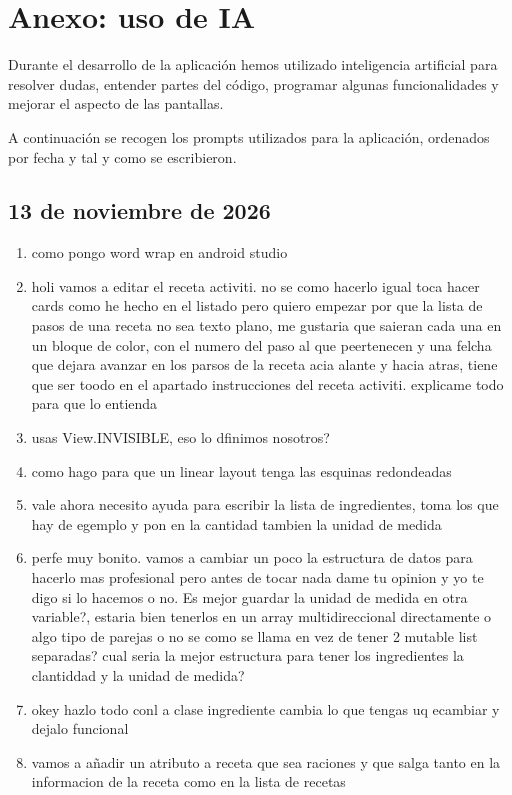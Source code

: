 \chapter{Anexo: uso de IA}
Durante el desarrollo de la aplicación hemos utilizado inteligencia artificial para resolver dudas, entender partes del código, programar algunas funcionalidades y mejorar el aspecto de las pantallas.

A continuación se recogen los prompts utilizados para la aplicación, ordenados por fecha y tal y como se escribieron.

\section{13 de noviembre de 2026}
\begin{enumerate}
  \item como pongo word wrap en android studio
  \item holi vamos a editar el receta activiti. no se como hacerlo igual toca hacer cards como he hecho en el listado pero quiero empezar por que la lista de pasos de una receta no sea texto plano, me gustaria que saieran cada una en un bloque de color, con el numero del paso al que peertenecen y una felcha que dejara avanzar en los parsos de la receta acia alante y hacia atras, tiene que ser toodo en el apartado instrucciones del receta activiti. explicame todo para que lo entienda
  \item usas View.INVISIBLE, eso lo dfinimos nosotros?
  \item como hago para que un linear layout tenga las esquinas redondeadas
  \item vale ahora necesito ayuda para escribir la lista de ingredientes, toma los que hay de egemplo y pon en la cantidad tambien la unidad de medida
  \item perfe muy bonito. vamos a cambiar un poco la estructura de datos para hacerlo mas profesional pero antes de tocar nada dame tu opinion y yo te digo si lo hacemos o no. Es mejor guardar la unidad de medida en otra variable?, estaria bien tenerlos en un array multidireccional directamente o algo tipo de parejas o no se como se llama en vez de tener 2 mutable list separadas? cual seria la mejor estructura para tener los ingredientes la clantiddad y la unidad de medida?
  \item okey hazlo todo conl a clase ingrediente cambia lo que tengas uq ecambiar y dejalo funcional
  \item vamos a añadir un atributo a receta que sea raciones y que salga tanto en la informacion de la receta como en la lista de recetas

\end{enumerate}
